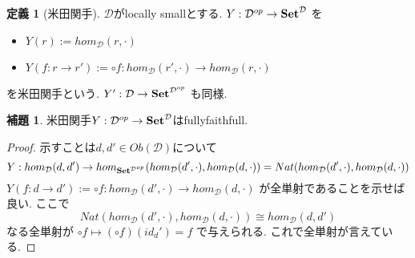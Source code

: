 \documentclass[dvipdfmx,a4paper,11pt]{report}
\theoremstyle{definition}
\newtheorem{lem}[thm]{補題}
\newtheorem{dfn}[thm]{定義}
\begin{document}
 \begin{tcolorbox}
 [colback = white, colframe = green!35!black, fonttitle = \bfseries,breakable = true]
\begin{dfn}[米田関手]
$\mathcal{D} $がlocally smallとする. 
$Y  : \mathcal{D}^{op} \to {\bf Set}^{\mathcal{D}}$ を
\begin{itemize}
\item $Y(r) := hom_{\mathcal{D}}(r, \cdot)$
\item $Y(f:r\to r') := \circ f :hom_{\mathcal{D}}(r', \cdot)\to hom_{\mathcal{D}}(r, \cdot)  $
\end{itemize}
を米田関手という.
$Y ' : \mathcal{D} \to {\bf Set}^{\mathcal{D}^{op}}$ も同様.
\end{dfn}
\begin{lem}
米田関手$Y  : \mathcal{D}^{op} \to {\bf Set}^{\mathcal{D}}$はfullyfaithfull.
\end{lem}
\end{tcolorbox}

 \begin{proof}
示すことは$d,d' \in Ob(\mathcal{D})$について
$$
Y:
hom_{\mathcal{D}} (d,d') \to 
hom_{{\bf Set}^{\mathcal{D}^{op}}} ( hom_{\mathcal{D}}(d', \cdot), hom_{\mathcal{D}}(d, \cdot) )
=
Nat ( hom_{\mathcal{D}}(d', \cdot), hom_{\mathcal{D}}(d, \cdot) )
$$
$Y(f : d \to d') := \circ f : hom_{\mathcal{D}}(d', \cdot) \to  hom_{\mathcal{D}}(d, \cdot)$
が全単射であることを示せば良い.
ここで
$$
Nat ( hom_{\mathcal{D}}(d', \cdot), hom_{\mathcal{D}}(d, \cdot) )
\cong
hom_{\mathcal{D}}(d, d') 
$$
なる全単射が
$ \circ f \mapsto   (\circ f) (id_d') = f$
で与えられる. これで全単射が言えている. 
\end{proof}
\end{document}
